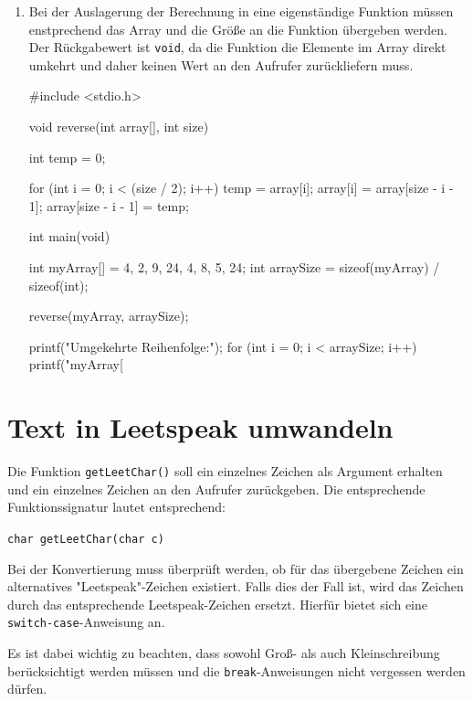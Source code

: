 \begin{enumerate}
\item Bei der Auslagerung der Berechnung in eine eigenständige Funktion müssen
enstprechend das Array und die Größe an die Funktion übergeben werden. Der
Rückgabewert ist \texttt{void}, da die Funktion die Elemente im Array
direkt umkehrt und daher keinen Wert an den Aufrufer zurückliefern muss.

\begin{codebox}[lang=c, fontsize=\small]
#include <stdio.h>

void reverse(int array[], int size) {
    int temp = 0;

    for (int i = 0; i < (size / 2); i++) {
        temp = array[i];
        array[i] = array[size - i - 1];
        array[size - i - 1] = temp;
    }
}

int main(void) {
    int myArray[] = {4, 2, 9, 24, 4, 8, 5, 24};
    int arraySize = sizeof(myArray) / sizeof(int);

    reverse(myArray, arraySize);

    printf("Umgekehrte Reihenfolge:\n");
    for (int i = 0; i < arraySize; i++) {
        printf("myArray[%
    }
}
\end{codebox}

\end{enumerate}


\chapter{Text in Leetspeak umwandeln}

Die Funktion \texttt{getLeetChar()} soll ein einzelnes Zeichen als
Argument erhalten und ein einzelnes Zeichen an den Aufrufer zurückgeben. Die
entsprechende Funktionssignatur lautet entsprechend:

\texttt{char getLeetChar(char c)}

Bei der Konvertierung muss überprüft werden, ob für das übergebene Zeichen ein
alternatives "Leetspeak"-Zeichen existiert. Falls dies der Fall ist, wird das
Zeichen durch das entsprechende Leetspeak-Zeichen ersetzt. Hierfür bietet sich
eine \texttt{switch-case}-Anweisung an.

Es ist dabei wichtig zu beachten, dass sowohl Groß- als auch Kleinschreibung
berücksichtigt werden müssen und die \texttt{break}-Anweisungen nicht
vergessen werden dürfen.

